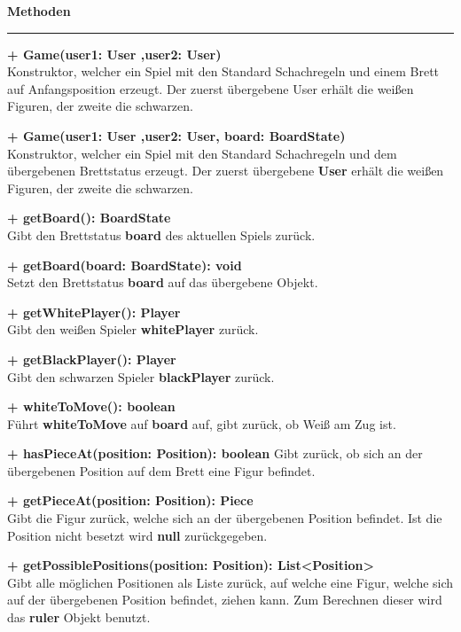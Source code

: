 \documentclass[parskip=full]{scrartcl}
\begin{document}
				 \textbf{\large{Methoden}}
				 \newline
		 		\rule{\textwidth}{1pt}
	 			\begin{description}
					 \item \textbf{+ Game(user1: User ,user2: User)}\\ Konstruktor, welcher ein Spiel mit den Standard Schachregeln und einem Brett auf Anfangsposition erzeugt. Der zuerst übergebene User erhält die weißen Figuren, der zweite die schwarzen.
					 \item \textbf{+ Game(user1: User ,user2: User, board: BoardState)}\\ Konstruktor, welcher ein Spiel mit den Standard Schachregeln und dem übergebenen Brettstatus erzeugt. Der zuerst übergebene \textbf{User} erhält die weißen Figuren, der zweite die schwarzen.
					 \item \textbf{+ getBoard(): BoardState}\\ Gibt den Brettstatus \textbf{board} des aktuellen Spiels zurück.
					\item \textbf{+ getBoard(board: BoardState): void}\\ Setzt den Brettstatus \textbf{board} auf das übergebene Objekt.
					\item \textbf{+ getWhitePlayer(): Player}\\ Gibt den weißen Spieler \textbf{whitePlayer} zurück.
					\item \textbf{+ getBlackPlayer(): Player}\\ Gibt den schwarzen Spieler \textbf{blackPlayer} zurück.
					\item \textbf{+ whiteToMove(): boolean}\\ Führt \textbf{whiteToMove} auf \textbf{board} auf, gibt zurück, ob Weiß am Zug ist.
					\item \textbf{+ hasPieceAt(position: Position): boolean} Gibt zurück, ob sich an der übergebenen Position auf dem Brett eine Figur befindet.
					\item \textbf{+ getPieceAt(position: Position): Piece}\\ Gibt die Figur zurück, welche sich an der übergebenen Position befindet. Ist die Position nicht besetzt wird \textbf{null} zurückgegeben.             
					\item \textbf{+ getPossiblePositions(position: Position): List<Position>}\\ Gibt alle möglichen Positionen als Liste zurück, auf welche eine Figur, welche sich auf der übergebenen Position befindet, ziehen kann. Zum Berechnen dieser wird das \textbf{ruler} Objekt benutzt.

\end{description}
\end{document}
